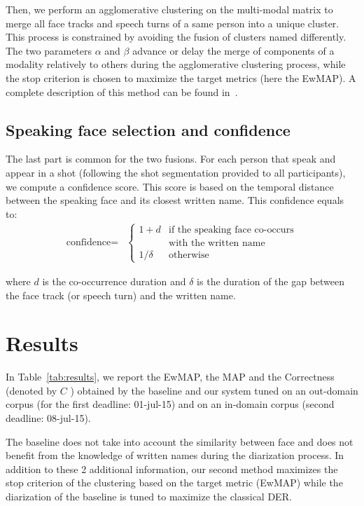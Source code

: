 \documentclass{acm_proc_article-me}
\begin{document}
Then, we perform an agglomerative clustering on the multi-modal matrix to merge all face tracks and speech turns of a same person into a unique cluster. This process is constrained by avoiding the fusion of clusters named differently. The two parameters $\alpha$ and $\beta$ advance or delay the merge of components of a modality relatively to others during the agglomerative clustering process, while the stop criterion is chosen to maximize the target metrics (here the EwMAP). A complete description of this method can be found in~\cite{POIGNANT--MTAP--2015}. 

\subsection{Speaking face selection and confidence}

The last part is common for the two fusions. For each person that speak and appear in a shot (following the shot segmentation provided to all participants), we compute a confidence score. This score is based on the temporal distance between the speaking face and its closest written name. This confidence equals to:
\begin{align*}
  \text{confidence} = & \left\{
  	\begin{array}{ll}
  		1+d  & \mbox{if the speaking face co-occurs}  \\
  		 	 & \mbox{with the written name}		\\
  		1/\delta &\mbox{otherwise}
  	\end{array}
  \right.
\end{align*}

\noindent where $d$ is the co-occurrence duration and $\delta$ is the duration of the gap between the face track (or speech turn) and the written name.

\section{Results}

In Table~\ref{tab:results}, we report the EwMAP, the MAP and the Correctness (denoted by $C$ ) obtained by the baseline and our system tuned on an out-domain corpus (for the first deadline: 01-jul-15) and on an in-domain corpus (second deadline: 08-jul-15).

The baseline does not take into account the similarity between face and does not benefit from the knowledge of written names during the diarization process. In addition to these 2 additional information, our second method maximizes the stop criterion of the clustering based on the target metric (EwMAP) while the diarization of the baseline is tuned to maximize the classical DER. 
\end{document}
